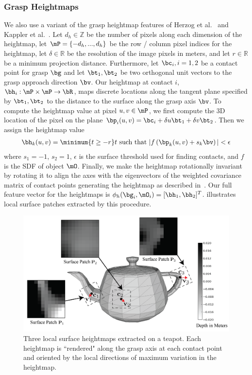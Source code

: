 \subsubsection{Grasp Heightmaps}
We also use a variant of the grasp heightmap features of Herzog et al.~\cite{herzog2012template} and Kappler et al.~\cite{kappler2015leveraging}.
Let $d_h \in \mathbb{Z}$ be the number of pixels along each dimension of the heightmap, let $\mP = \{-d_h, ..., d_h\}$ be the row / column pixel indices for the heightmap, let $\delta \in \mathbb{R}$ be the resolution of the image pixels in meters, and let $r \in \mathbb{R}$ be a minimum projection distance.
Furthermore, let $\bc_i, i = 1, 2$ be a contact point for grasp $\bg$ and let $\bt_1, \bt_2$ be two orthogonal unit vectors to the grasp approach direction $\bv$.
Our heightmap at contact $i$, $\bh_{i}: \mP \times \mP \rightarrow \bR$, maps discrete locations along the tangent plane specified by $\bt_1, \bt_2$ to the distance to the surface along the grasp axis $\bv$.
To compute the heightmap value at pixel $u,v \in \mP$, we first compute the 3D location of the pixel on the plane $\bp_i(u,v) = \bc_i + \delta u \bt_1 + \delta v \bt_2$.
Then we assign the heightmap value
\begin{align*}
	\bh_k(u,v) = \minimum{t \geq -r} t \text{ such that } | f\left( \bp_k(u,v) + s_k \bv \right) | < \epsilon
\end{align*}
 where $s_1 = -1$, $s_2 = 1$, $\epsilon$ is the surface threshold used for finding contacts, and $f$ is the SDF of object $\mO$. 
Finally, we make the heightmap rotationally invariant by rotating it to align the axes with the eigenvectors of the weighted covariance matrix of contact points generating the heightmap as described in~\cite{tombariunique}.
Our full feature vector for the heightmaps is $\phi_{h}(\bg_i, \mO_i) = [\bh_1, \bh_2]^T$. 
 illustrates local surface patches extracted by this procedure.

\begin{figure}[t!]
\centering
\includegraphics[scale=0.35]{figures/illustrations/local_feature_model.png}
\caption{Three local surface heightmaps extracted on a teapot. Each heightmap is ``rendered" along the grasp axis at each contact point and oriented by the local directions of maximum variation in the heightmap.  }
\vspace*{-15pt}
\end{figure}

